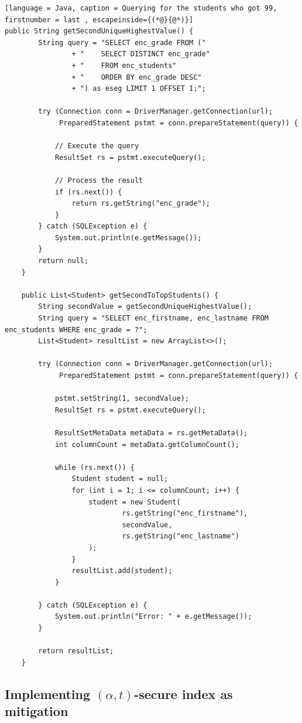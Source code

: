 \begin{lstlisting}[language = Java, caption = Querying for the students who got 99, firstnumber = last , escapeinside={(*@}{@*)}]
public String getSecondUniqueHighestValue() {
        String query = "SELECT enc_grade FROM ("
                + "    SELECT DISTINCT enc_grade"
                + "    FROM enc_students"
                + "    ORDER BY enc_grade DESC"
                + ") as eseg LIMIT 1 OFFSET 1;";

        try (Connection conn = DriverManager.getConnection(url);
             PreparedStatement pstmt = conn.prepareStatement(query)) {

            // Execute the query
            ResultSet rs = pstmt.executeQuery();

            // Process the result
            if (rs.next()) {
                return rs.getString("enc_grade");
            }
        } catch (SQLException e) {
            System.out.println(e.getMessage());
        }
        return null;
    }

    public List<Student> getSecondToTopStudents() {
        String secondValue = getSecondUniqueHighestValue();
        String query = "SELECT enc_firstname, enc_lastname FROM enc_students WHERE enc_grade = ?";
        List<Student> resultList = new ArrayList<>();

        try (Connection conn = DriverManager.getConnection(url);
             PreparedStatement pstmt = conn.prepareStatement(query)) {

            pstmt.setString(1, secondValue);
            ResultSet rs = pstmt.executeQuery();

            ResultSetMetaData metaData = rs.getMetaData();
            int columnCount = metaData.getColumnCount();

            while (rs.next()) {
                Student student = null;
                for (int i = 1; i <= columnCount; i++) {
                    student = new Student(
                            rs.getString("enc_firstname"),
                            secondValue,
                            rs.getString("enc_lastname")
                    );
                }
                resultList.add(student);
            }

        } catch (SQLException e) {
            System.out.println("Error: " + e.getMessage());
        }

        return resultList;
    }
\end{lstlisting}
\newpage
\subsection{Implementing $(\alpha, t)$-secure index as mitigation}

